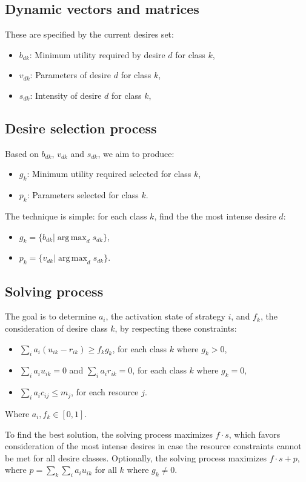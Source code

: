 \documentclass[12pt]{article}
\DeclareMathOperator*{\argmax}{arg\,max}
\begin{document}
\subsection*{Dynamic vectors and matrices} 

These are specified by the current desires set:

\begin{itemize}
	\item $b_{dk}$: Minimum utility required by desire $d$ for class $k$,
	\item $v_{dk}$: Parameters of desire $d$ for class $k$,
	\item $s_{dk}$: Intensity of desire $d$ for class $k$,
\end{itemize}

\subsection*{Desire selection process}

Based on $b_{dk}$, $v_{dk}$ and $s_{dk}$, we aim to produce:

\begin{itemize}
	\item $g_{k}$: Minimum utility required selected for class $k$,
	\item $p_{k}$: Parameters selected for class $k$.
\end{itemize}

The technique is simple: for each class $k$, find the the most intense desire $d$:

\begin{itemize}
	\item $g_{k} = \{ b_{dk} | \argmax_d s_{dk} \} $,
	\item $p_{k} = \{ v_{dk} | \argmax_d s_{dk} \} $. 
\end{itemize}

\subsection*{Solving process}
The goal is to determine $a_{i}$, the activation state of strategy $i$, and
$f_{k}$, the consideration of desire class $k$, by respecting these constraints:

\begin{itemize}
	\item $\sum\limits_i a_i (u_{ik} - r_{ik}) \geq f_k g_k$, for each class $k$
        where $g_k > 0$, 
	\item $\sum\limits_i a_i u_{ik} = 0$ and $\sum\limits_i a_i r_{ik} = 0$, for each class $k$
        where $g_k = 0$, 
	\item $\sum\limits_i a_i c_{ij} \leq m_j$, for each resource $j$.
\end{itemize}

Where $a_i, f_k \in [0,1]$.

To find the best solution, the solving process maximizes $f \cdot s$, which 
favors consideration of the most intense desires in case the resource 
constraints cannot be met for all desire classes.
Optionally, the solving process maximizes $f \cdot s + p$, where $p = \sum\limits_k\sum\limits_i a_i u_{ik}$ for all $k$ where $g_k \neq 0$.
\end{document}
